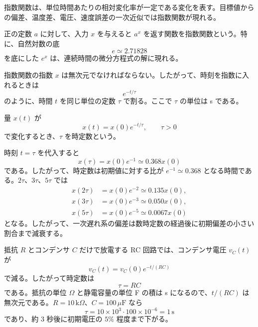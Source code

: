 指数関数は、単位時間あたりの相対変化率が一定である変化を表す。目標値からの偏差、温度差、電圧、速度誤差の一次近似では指数関数が現れる。

\begin{definition}[指数関数]
正の定数 $a$ に対して、入力 $x$ を与えると $a^x$ を返す関数を指数関数という。特に、自然対数の底
\begin{equation}
  e\simeq 2.71828
\end{equation}
を底にした $e^x$ は、連続時間の微分方程式の解に現れる。
\end{definition}

指数関数の指数 $x$ は無次元でなければならない。したがって、時刻を指数に入れるときは
\begin{equation}
  e^{-t/\tau}
\end{equation}
のように、時間 $t$ を同じ単位の定数 $\tau$ で割る。ここで $\tau$ の単位は s である。

\begin{definition}[時定数]
量 $x(t)$ が
\begin{equation}
  x(t)=x(0)e^{-t/\tau},\qquad \tau>0
\end{equation}
で変化するとき、$\tau$ を時定数という。
\end{definition}

時刻 $t=\tau$ を代入すると
\begin{equation}
  x(\tau)=x(0)e^{-1}\simeq0.368x(0)
\end{equation}
である。したがって、時定数は初期値に対する比が $e^{-1}\simeq0.368$ となる時間である。$2\tau$、$3\tau$、$5\tau$ では
\begin{align}
  x(2\tau)&=x(0)e^{-2}\simeq0.135x(0),\\
  x(3\tau)&=x(0)e^{-3}\simeq0.050x(0),\\
  x(5\tau)&=x(0)e^{-5}\simeq0.0067x(0)
\end{align}
となる。したがって、一次遅れ系の偏差は数時定数の経過後に初期偏差の小さい割合まで減衰する。

\begin{example}[RC 回路の電圧]
抵抗 $R$ とコンデンサ $C$ だけで放電する RC 回路では、コンデンサ電圧 $v_C(t)$ が
\begin{equation}
  v_C(t)=v_C(0)e^{-t/(RC)}
\end{equation}
で減る。したがって時定数は
\begin{equation}
  \tau=RC
\end{equation}
である。抵抗の単位 $\Omega$ と静電容量の単位 F の積は s になるので、$t/(RC)$ は無次元である。$R=10\,\mathrm{k}\Omega$、$C=100\,\mu\mathrm{F}$ なら
\begin{equation}
  \tau=10\times10^3\cdot100\times10^{-6}=1\,\mathrm{s}
\end{equation}
であり、約 3 秒後に初期電圧の $5\%$ 程度まで下がる。
\end{example}

